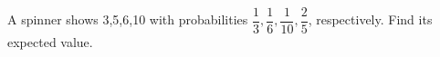 A spinner shows 3,5,6,10 with probabilities $\dfrac{1}{3},\dfrac{1}{6},\dfrac{1}{10},\dfrac{2}{5}$, respectively. Find its expected value.
